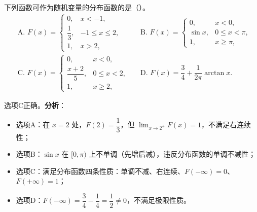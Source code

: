 ﻿\documentclass[lang=cn,11pt]{elegantbook}
\begin{document}
\begin{exercise}[分布函数性质判断]
下列函数可作为随机变量的分布函数的是（\quad）。
\[
\begin{aligned}
&\text{A. } F(x)=
\begin{cases}
0, & x<-1, \\[4pt]
\dfrac{1}{3}, & -1\leqslant x\leqslant2, \\[4pt]
1, & x>2,
\end{cases}
&&\text{B. } F(x)=
\begin{cases}
0, & x<0, \\[4pt]
\sin x, & 0\leqslant x<\pi, \\[4pt]
1, & x\geqslant\pi,
\end{cases} \\[10pt]
&\text{C. } F(x)=
\begin{cases}
0, & x<0, \\[4pt]
\dfrac{x+2}{5}, & 0\leqslant x<2, \\[4pt]
1, & x\geqslant2,
\end{cases}
&&\text{D. } F(x)=\dfrac{3}{4}+\dfrac{1}{2\pi}\arctan x.
\end{aligned}
\]
\end{exercise}
\begin{solution}
选项C正确。\textbf{分析}：
\begin{itemize}
    \item 选项A：在 $x=2$ 处，$F(2)=\dfrac{1}{3}$，但 $\displaystyle\lim_{x\to2^+}F(x)=1$，不满足右连续性；
    \item 选项B：$\sin x$ 在 $[0,\pi)$ 上不单调（先增后减），违反分布函数的单调不减性；
    \item 选项C：满足分布函数四条性质：单调不减、右连续、$F(-\infty)=0$、$F(+\infty)=1$；
    \item 选项D：$F(-\infty)=\dfrac{3}{4}-\dfrac{1}{4}=\dfrac{1}{2}\neq0$，不满足极限性质。
\end{itemize}
\end{solution}
\end{document}
